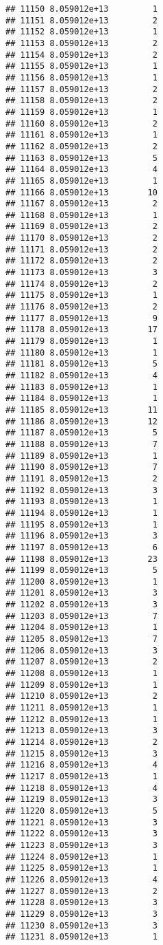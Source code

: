 \documentclass[
]{article}
\begin{document}
\begin{verbatim}
## 11150 8.059012e+13         1
## 11151 8.059012e+13         2
## 11152 8.059012e+13         1
## 11153 8.059012e+13         2
## 11154 8.059012e+13         2
## 11155 8.059012e+13         1
## 11156 8.059012e+13         1
## 11157 8.059012e+13         2
## 11158 8.059012e+13         2
## 11159 8.059012e+13         1
## 11160 8.059012e+13         2
## 11161 8.059012e+13         1
## 11162 8.059012e+13         2
## 11163 8.059012e+13         5
## 11164 8.059012e+13         4
## 11165 8.059012e+13         1
## 11166 8.059012e+13        10
## 11167 8.059012e+13         2
## 11168 8.059012e+13         1
## 11169 8.059012e+13         2
## 11170 8.059012e+13         2
## 11171 8.059012e+13         2
## 11172 8.059012e+13         2
## 11173 8.059012e+13         3
## 11174 8.059012e+13         2
## 11175 8.059012e+13         1
## 11176 8.059012e+13         2
## 11177 8.059012e+13         9
## 11178 8.059012e+13        17
## 11179 8.059012e+13         1
## 11180 8.059012e+13         1
## 11181 8.059012e+13         5
## 11182 8.059012e+13         4
## 11183 8.059012e+13         1
## 11184 8.059012e+13         1
## 11185 8.059012e+13        11
## 11186 8.059012e+13        12
## 11187 8.059012e+13         5
## 11188 8.059012e+13         7
## 11189 8.059012e+13         1
## 11190 8.059012e+13         7
## 11191 8.059012e+13         2
## 11192 8.059012e+13         3
## 11193 8.059012e+13         1
## 11194 8.059012e+13         1
## 11195 8.059012e+13         1
## 11196 8.059012e+13         3
## 11197 8.059012e+13         6
## 11198 8.059012e+13        23
## 11199 8.059012e+13         5
## 11200 8.059012e+13         1
## 11201 8.059012e+13         3
## 11202 8.059012e+13         3
## 11203 8.059012e+13         7
## 11204 8.059012e+13         1
## 11205 8.059012e+13         7
## 11206 8.059012e+13         3
## 11207 8.059012e+13         2
## 11208 8.059012e+13         1
## 11209 8.059012e+13         1
## 11210 8.059012e+13         2
## 11211 8.059012e+13         1
## 11212 8.059012e+13         1
## 11213 8.059012e+13         3
## 11214 8.059012e+13         2
## 11215 8.059012e+13         3
## 11216 8.059012e+13         4
## 11217 8.059012e+13         1
## 11218 8.059012e+13         4
## 11219 8.059012e+13         3
## 11220 8.059012e+13         5
## 11221 8.059012e+13         3
## 11222 8.059012e+13         3
## 11223 8.059012e+13         3
## 11224 8.059012e+13         1
## 11225 8.059012e+13         1
## 11226 8.059012e+13         4
## 11227 8.059012e+13         2
## 11228 8.059012e+13         3
## 11229 8.059012e+13         3
## 11230 8.059012e+13         3
## 11231 8.059012e+13         1

\end{verbatim}
\end{document}
